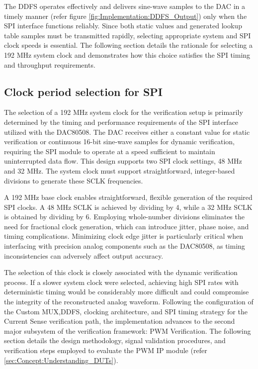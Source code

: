 The \acs{DDFS} operates effectively and delivers sine-wave samples to the \acs{DAC} in a timely manner (refer figure \ref{fig:Implementation:DDFS_Output}) only when the \acs{SPI} interface functions reliably. Since both static values and generated lookup table samples must be transmitted rapidly, selecting appropriate system and \acs{SPI} clock speeds is essential. The following section details the rationale for selecting a 192 MHz system clock and demonstrates how this choice satisfies the \acs{SPI} timing and throughput requirements.

\subsection{Clock period selection for \acs{SPI}}
\label{sec:Implementation:ClockPeriod_for_SPI}

The selection of a 192 MHz system clock for the verification setup is primarily determined by the timing and performance requirements of the \acs{SPI} interface utilized with the DAC80508. The \acs{DAC} receives either a constant value for static verification or continuous 16-bit sine-wave samples for dynamic verification, requiring the \acs{SPI} module to operate at a speed sufficient to maintain uninterrupted data flow. This design supports two \acs{SPI} clock settings, 48 MHz and 32 MHz. The system clock must support straightforward, integer-based divisions to generate these SCLK frequencies.

A 192 MHz base clock enables straightforward, flexible generation of the required \acs{SPI} clocks. A 48 MHz SCLK is achieved by dividing by 4, while a 32 MHz SCLK is obtained by dividing by 6. Employing whole-number divisions eliminates the need for fractional clock generation, which can introduce jitter, phase noise, and timing complications. Minimizing clock edge jitter is particularly critical when interfacing with precision analog components such as the DAC80508, as timing inconsistencies can adversely affect output accuracy.

The selection of this clock is closely associated with the dynamic verification process. If a slower system clock were selected, achieving high \acs{SPI} rates with deterministic timing would be considerably more difficult and could compromise the integrity of the reconstructed analog waveform. Following the configuration of the Custom MUX,\acs{DDFS}, clocking architecture, and \acs{SPI} timing strategy for the Current Sense verification path, the implementation advances to the second major subsystem of the verification framework: \acs{PWM} Verification. The following section details the design methodology, signal validation procedures, and verification steps employed to evaluate the \acs{PWM} \acs{IP} module (refer \ref{sec:Concept:Understanding_DUTs}). 

